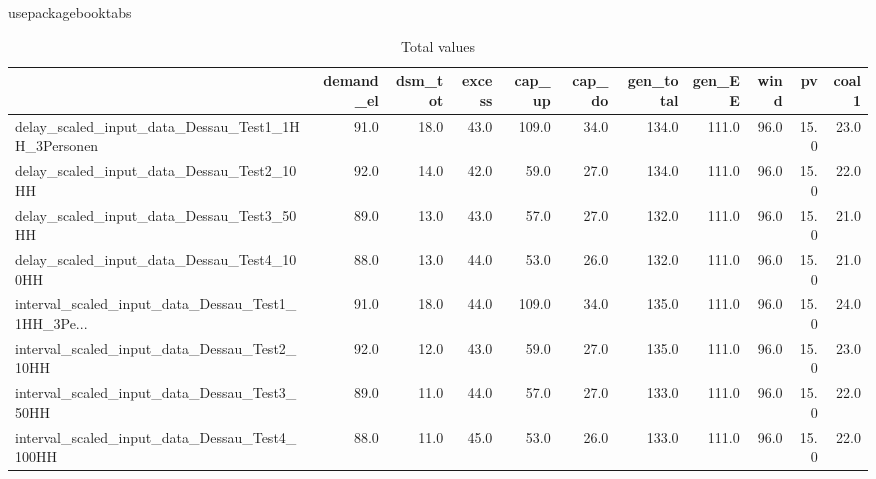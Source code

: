 usepackage{booktabs}

\begin{table}
 \caption{Total values}
\begin{tabular}{lrrrrrrrrrr}
\toprule
{} &  demand\_el &  dsm\_tot &  excess &  cap\_up &  cap\_do &  gen\_total &  gen\_EE &  wind &    pv &  coal1 \\
\midrule
delay\_scaled\_input\_data\_Dessau\_Test1\_1HH\_3Personen &       91.0 &     18.0 &    43.0 &   109.0 &    34.0 &      134.0 &   111.0 &  96.0 &  15.0 &   23.0 \\
delay\_scaled\_input\_data\_Dessau\_Test2\_10HH          &       92.0 &     14.0 &    42.0 &    59.0 &    27.0 &      134.0 &   111.0 &  96.0 &  15.0 &   22.0 \\
delay\_scaled\_input\_data\_Dessau\_Test3\_50HH          &       89.0 &     13.0 &    43.0 &    57.0 &    27.0 &      132.0 &   111.0 &  96.0 &  15.0 &   21.0 \\
delay\_scaled\_input\_data\_Dessau\_Test4\_100HH         &       88.0 &     13.0 &    44.0 &    53.0 &    26.0 &      132.0 &   111.0 &  96.0 &  15.0 &   21.0 \\
interval\_scaled\_input\_data\_Dessau\_Test1\_1HH\_3Pe... &       91.0 &     18.0 &    44.0 &   109.0 &    34.0 &      135.0 &   111.0 &  96.0 &  15.0 &   24.0 \\
interval\_scaled\_input\_data\_Dessau\_Test2\_10HH       &       92.0 &     12.0 &    43.0 &    59.0 &    27.0 &      135.0 &   111.0 &  96.0 &  15.0 &   23.0 \\
interval\_scaled\_input\_data\_Dessau\_Test3\_50HH       &       89.0 &     11.0 &    44.0 &    57.0 &    27.0 &      133.0 &   111.0 &  96.0 &  15.0 &   22.0 \\
interval\_scaled\_input\_data\_Dessau\_Test4\_100HH      &       88.0 &     11.0 &    45.0 &    53.0 &    26.0 &      133.0 &   111.0 &  96.0 &  15.0 &   22.0 \\
\bottomrule
\end{tabular}
\end{table}
